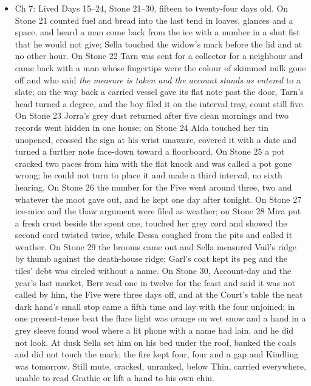 \documentclass{design/chronicle}
\begin{document}
{\begin{itemize}[leftmargin=1.4em,itemsep=1pt,topsep=3pt,parsep=0pt]
\end{itemize}

\begin{itemize}[leftmargin=1.4em,itemsep=1pt,topsep=3pt,parsep=0pt]

\item Ch 7: Lived Days 15--24, Stone 21--30, fifteen to twenty-four days old. On Stone 21 counted fuel and bread into the last tend in loaves, glances and a space, and heard a man come back from the ice with a number in a shut fist that he would not give; Sella touched the widow’s mark before the lid and at no other hour. On Stone 22 Tarn was sent for a collector for a neighbour and came back with a man whose fingertips were the colour of skimmed milk gone off and who said \emph{the measure is taken and the account stands as entered} to a slate; on the way back a carried vessel gave its flat note past the door, Tarn’s head turned a degree, and the boy filed it on the interval tray, count still five. On Stone 23 Jorra’s grey dust returned after five clean mornings and two records went hidden in one house; on Stone 24 Alda touched her tin unopened, crossed the sign at his wrist unaware, covered it with a date and turned a further note face-down toward a floorboard. On Stone 25 a pot cracked two paces from him with the flat knock and was called a pot gone wrong; he could not turn to place it and made a third interval, no sixth hearing. On Stone 26 the number for the Five went around three, two and whatever the moot gave out, and he kept one day after tonight. On Stone 27 ice-mice and the thaw argument were filed as weather; on Stone 28 Mira put a fresh crust beside the spent one, touched her grey cord and showed the second cord twisted twice, while Dessa coughed from the pits and called it weather. On Stone 29 the brooms came out and Sella measured Vail’s ridge by thumb against the death-house ridge; Garl’s coat kept its peg and the tiles’ debt was circled without a name. On Stone 30, Account-day and the year’s last market, Berr read one in twelve for the feast and said it was not called by him, the Five were three days off, and at the Court’s table the neat dark hand’s small stop came a fifth time and lay with the four unjoined; in one present-tense beat the flare light was orange on wet snow and a hand in a grey sleeve found wool where a lit phone with a name had lain, and he did not look. At dusk Sella set him on his bed under the roof, banked the coals and did not touch the mark; the fire kept four, four and a gap and Kindling was tomorrow. Still mute, cracked, unranked, below Thin, carried everywhere, unable to read Grathic or lift a hand to his own chin.


\end{itemize}}
\end{document}
